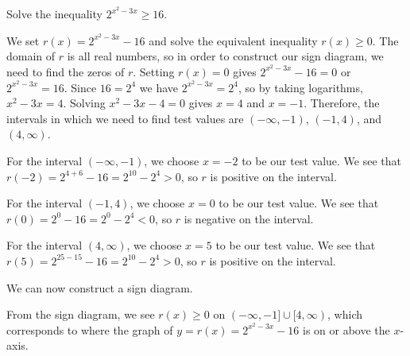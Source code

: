 \documentclass[noauthor, nooutcomes]{ximera}
\begin{document}
\begin{example}
Solve the inequality $2^{x^2 - 3x} \ge 16$.
\end{example}
\begin{explanation}
We set $r(x) = 2^{x^2-3x} - 16$ and solve the equivalent inequality $r(x) \ge 0$.  The domain of $r$ is all real numbers, so in order to construct our sign diagram, we need to find the zeros of $r$.  Setting $r(x) = 0$ gives $2^{x^2-3x} - 16 = 0$ or $2^{x^2-3x} = 16$.  Since $16 = 2^{4}$ we have $2^{x^2-3x} = 2^{4}$, so by taking logarithms, $x^2 -3x = 4$.  Solving $x^2 -3x - 4 = 0$ gives $x=4$ and $x=-1$. Therefore, the intervals in which we need to find test values are $(-\infty, -1)$, $(-1, 4)$, and $(4, \infty)$. 

For the interval $(-\infty, -1)$, we choose $x = -2$ to be our test value. We see that $r(-2) = 2^{4 + 6} - 16 = 2^{10} - 2^4 > 0$, so $r$ is positive on the interval. 

For the interval $(-1, 4)$, we choose $x = 0$ to be our test value. We see that $r(0) = 2^{0} - 16 = 2^0 - 2^4 < 0$, so $r$ is negative on the interval.

For the interval $(4, \infty)$, we choose $x = 5$ to be our test value. We see that $r(5) = 2^{25 - 15} - 16 = 2^{10} - 2^4> 0$, so $r$ is positive on the interval.

We can now construct a sign diagram.

\begin{image}
\end{image}

From the sign diagram, we see $r(x) \geq 0$ on $(-\infty, -1] \cup [4, \infty)$, which corresponds to where the graph of  $y=r(x) = 2^{x^2-3x} - 16$ is on or above the $x$-axis.

\end{explanation}
\end{document}
